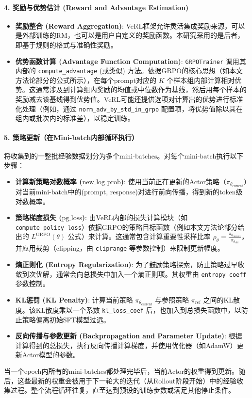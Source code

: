 \documentclass{article}
\begin{document}
\paragraph{4. 奖励与优势估计 (Reward and Advantage Estimation)}
\begin{itemize}
    \item \textbf{奖励整合 (Reward Aggregation)}: VeRL框架允许灵活集成奖励来源，可以是外部训练的RM，也可以是用户自定义的奖励函数。本研究采用的是后者，即基于规则的格式与准确性奖励。
    \item \textbf{优势函数计算 (Advantage Function Computation)}: \texttt{GRPOTrainer} 调用其内部的 \texttt{compute\_advantage} (或类似) 方法。依据GRPO的核心思想（如本文方法论部分的公式所示），在每个prompt对应的 $K$ 个样本组内部计算相对优势。这通常涉及到计算组内奖励的均值或中位数作为基线，然后用每个样本的奖励减去该基线得到优势值。VeRL可能还提供选项对计算出的优势进行标准化处理（例如，通过 \texttt{norm\_adv\_by\_std\_in\_grpo} 配置项，将优势值除以其在组内或批次内的标准差），以稳定训练。
\end{itemize}

\paragraph{5. 策略更新（在Mini-batch内部循环执行）}
将收集到的一整批经验数据划分为多个mini-batches。对每个mini-batch执行以下步骤：
\begin{itemize}
    \item \textbf{计算新策略对数概率 ($\text{new\_log\_prob}$)}: 使用当前正在更新的Actor策略（$\pi_{\theta_{\text{current}}}$）对当前mini-batch中的(prompt, response)对进行前向传播，得到新的token级对数概率。
    \item \textbf{策略梯度损失 ($\text{pg\_loss}$)}: 由VeRL内部的损失计算模块（如 \texttt{compute\_policy\_loss}）依据GRPO的策略目标函数（例如本文方法论部分给出的 $L^{\text{GRPO}}(\theta)$ 公式）来计算。这通常包含计算重要性采样比率 $\rho_{\theta} = \frac{\pi_{\theta_{\text{current}}}}{\pi_{\theta_{\text{old}}}}$，并应用裁剪（clipping，由 \texttt{cliprange} 等参数控制）来限制更新幅度。
    \item \textbf{熵正则化 (Entropy Regularization)}: 为了鼓励策略探索，防止策略过早收敛到次优解，通常会向总损失中加入一个熵正则项。其权重由 \texttt{entropy\_coeff} 参数控制。
    \item \textbf{KL惩罚 (KL Penalty)}: 计算当前策略 $\pi_{\theta_{\text{current}}}$ 与参照策略 $\pi_{\text{ref}}$ 之间的KL散度。该KL散度乘以一个系数 \texttt{kl\_loss\_coef} 后，也加入到总损失函数中，以防止策略偏离初始SFT模型过远。
    \item \textbf{反向传播与参数更新 (Backpropagation and Parameter Update)}: 根据计算得到的总损失，执行反向传播计算梯度，并使用优化器（如AdamW）更新Actor模型的参数。
\end{itemize}
当一个epoch内所有的mini-batches都处理完毕后，当前Actor的权重得到更新。随后，这些最新的权重会被用于下一轮大的迭代（从Rollout阶段开始）中的经验收集过程。整个流程循环往复，直至达到预设的训练步数或满足其他停止条件。
\end{document}
